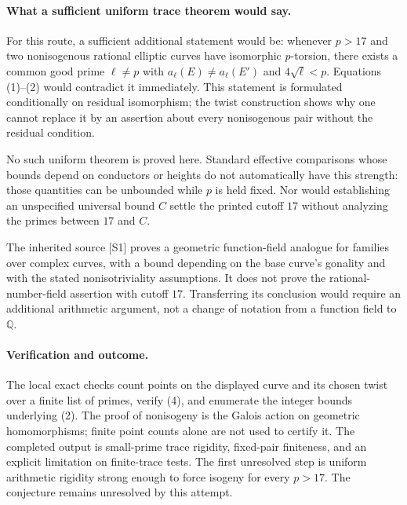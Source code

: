 \documentclass[11pt]{article}
\begin{document}
\paragraph{What a sufficient uniform trace theorem would say.}
For this route, a sufficient additional statement would be: whenever $p>17$ and two nonisogenous rational elliptic curves have isomorphic $p$-torsion, there exists a common good prime $\ell\ne p$ with $a_\ell(E)\ne a_\ell(E')$ and $4\sqrt\ell<p$. Equations (1)--(2) would contradict it immediately. This statement is formulated conditionally on residual isomorphism; the twist construction shows why one cannot replace it by an assertion about every nonisogenous pair without the residual condition.

No such uniform theorem is proved here. Standard effective comparisons whose bounds depend on conductors or heights do not automatically have this strength: those quantities can be unbounded while $p$ is held fixed. Nor would establishing an unspecified universal bound $C$ settle the printed cutoff $17$ without analyzing the primes between $17$ and $C$.

The inherited source [S1] proves a geometric function-field analogue for families over complex curves, with a bound depending on the base curve's gonality and with the stated nonisotriviality assumptions. It does not prove the rational-number-field assertion with cutoff $17$. Transferring its conclusion would require an additional arithmetic argument, not a change of notation from a function field to $\mathbb Q$.

\paragraph{Verification and outcome.}
The local exact checks count points on the displayed curve and its chosen twist over a finite list of primes, verify (4), and enumerate the integer bounds underlying (2). The proof of nonisogeny is the Galois action on geometric homomorphisms; finite point counts alone are not used to certify it. The completed output is small-prime trace rigidity, fixed-pair finiteness, and an explicit limitation on finite-trace tests. The first unresolved step is uniform arithmetic rigidity strong enough to force isogeny for every $p>17$. The conjecture remains unresolved by this attempt.
\end{document}

